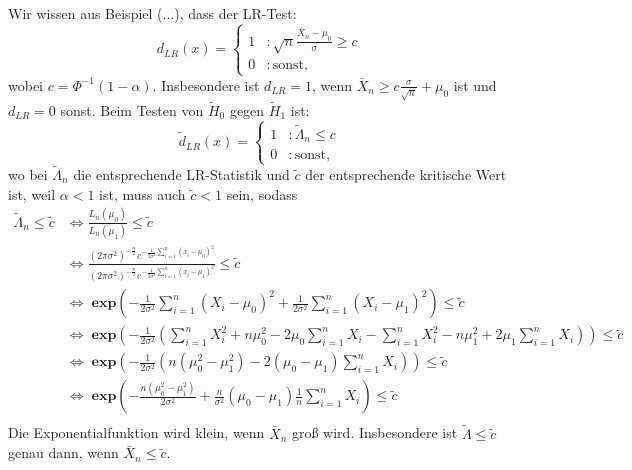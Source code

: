 \documentclass[10pt]{article}
\newcommand{\sni}{\sum_{i=1}^{n}} %
\newcommand{\dlr}{d_{LR}}%
\newenvironment{BWS}[1][]
{\begin{Beweis}[frametitle=#1]}{\end{Beweis}}
\begin{document}
\begin{BWS}[Beweis 2.1.2 (UMP z-Test)]
			Wir wissen aus Beispiel (...), dass der LR-Test:
			\begin{equation*}
				\dlr(x) = \begin{cases}
					1 &: \sqrt{n} \frac{\bar{X}_n - \mu_0}{\sigma} \geq c\\
					0 &: \text{sonst},
				\end{cases}
			\end{equation*}
			wobei $c = \Phi^{-1}(1-\alpha)$. Insbesondere ist $\dlr = 1$, wenn $\bar{X}_n \geq c \frac{\sigma}{\sqrt{n}}+ \mu_0$ ist und $\dlr = 0$ sonst. 
			Beim Testen von $\tilde{H}_0$ gegen $\tilde{H}_1$ ist: 
			\begin{equation*}
				\tilde{d}_{LR}(x) = \begin{cases}
					1 &: \tilde{\Lambda}_n \leq c\\
					0 &: \text{sonst},
				\end{cases}
			\end{equation*}
			wo bei $\tilde{\Lambda}_n$ die entsprechende LR-Statistik und $\tilde{c}$ der entsprechende kritische Wert ist, weil $\alpha < 1$ ist, muss auch $\tilde{c} < 1$ sein, sodass
			\begin{equation*}
				\begin{split}
					\tilde{\Lambda}_n \leq \tilde{c} &\Leftrightarrow \frac{L_n(\mu_0)}{L_n(\mu_1)} \leq \tilde{c}\\
					&\Leftrightarrow \frac{(2 \pi \sigma^2)^{-\frac{n}{2}} e ^{- \frac{1}{2 \sigma^2}\sni(x_i - \mu_0)^2}}{(2 \pi \sigma^2)^{-\frac{n}{2}} e ^{- \frac{1}{2 \sigma^2}\sni(x_i - \mu_1)^2}} \leq \tilde{c}\\
					&\Leftrightarrow\;  \textbf{exp}\left(- \frac{1}{2 \sigma^2}\sni (X_i-\mu_0)^2 + \frac{1}{2 \sigma^2} \sni (X_i - \mu_1)^2\right) \leq \tilde{c}\\
					&\Leftrightarrow \; \textbf{exp}\left(- \frac{1}{2 \sigma^2} \left( \sni X_i^2 + n \mu_0^2 - 2 \mu_0\sni X_i - \sni X_i^2 - n\mu_1^2 + 2\mu_1 \sni X_i\right)\right) \leq \tilde{c}\\
					&\Leftrightarrow \; \textbf{exp}\left(- \frac{1}{2 \sigma^2} \left( n ( \mu_0^2 - \mu_1^2) -2(\mu_0 - \mu_1) \sni X_i\right)\right) \leq \tilde{c}\\
					&\Leftrightarrow \; \textbf{exp}\left(- \frac{n(\mu_0^2 - \mu_1^2)}{2 \sigma^2} + \frac{n}{\sigma^2}(\mu_0 - \mu_1) \frac{1}{n} \sni X_i\right) \leq \tilde{c}\\
				\end{split}
			\end{equation*}
			Die Exponentialfunktion wird klein, wenn $\bar{X}_n$ groß wird. Insbesondere ist $\tilde{\Lambda} \leq \tilde{c}$ genau dann, wenn $\bar{X}_n \leq \tilde{c}$.

\end{BWS}
\end{document}

